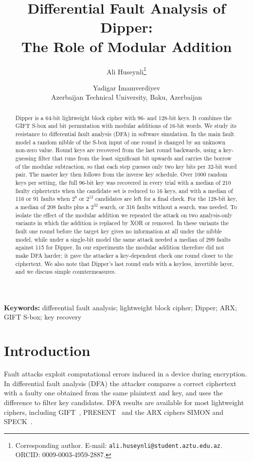 \documentclass[11pt,a4paper]{article}
\title{Differential Fault Analysis of Dipper:\\ The Role of Modular Addition}
\author{
Ali Huseynli\thanks{Corresponding author. E-mail: \texttt{ali.huseynli@student.aztu.edu.az}. ORCID: 0009-0003-4959-2887.}
\and Yadigar Imamverdiyev\\[4pt]
\small Azerbaijan Technical University, Baku, Azerbaijan
}
\date{}
\begin{document}
\maketitle

\begin{abstract}
Dipper is a 64-bit lightweight block cipher with 96- and 128-bit keys. It combines the GIFT
S-box and bit permutation with modular additions of 16-bit words. We study its resistance to
differential fault analysis (DFA) in software simulation. In the main fault model a random
nibble of the S-box input of one round is changed by an unknown non-zero value. Round keys are
recovered from the last round backwards, using a key-guessing filter that runs from the least
significant bit upwards and carries the borrow of the modular subtraction, so that each step
guesses only two key bits per 32-bit word pair. The master key then follows from the inverse
key schedule. Over 1000 random keys per setting, the full 96-bit key was recovered in every
trial with a median of 210 faulty ciphertexts when the candidate set is reduced to 16 keys, and
with a median of 116 or 91 faults when $2^{8}$ or $2^{12}$ candidates are left for a final
check. For the 128-bit key, a median of 208 faults plus a $2^{32}$ search, or 316 faults without
a search, was needed. To isolate the effect of the modular addition we repeated the attack on
two analysis-only variants in which the addition is replaced by XOR or removed. In these
variants the fault one round before the target key gives no information at all under the
nibble model, while under a single-bit model the same attack needed a median of 299 faults
against 115 for Dipper. In our experiments the modular addition therefore did not make DFA
harder; it gave the attacker a key-dependent check one round closer to the ciphertext. We
also note that Dipper's last round ends with a keyless, invertible layer, and we discuss simple
countermeasures.
\end{abstract}

\noindent\textbf{Keywords:} differential fault analysis; lightweight block cipher; Dipper;
ARX; GIFT S-box; key recovery

\section{Introduction}

Fault attacks exploit computational errors induced in a device during encryption. In
differential fault analysis (DFA) the attacker compares a correct ciphertext with a faulty one obtained from the same plaintext
and key, and uses the difference to filter key candidates. DFA results are available for
most lightweight ciphers, including GIFT~\cite{Xie2021,Luo2021,Saha2018}, PRESENT~\cite{Bagheri2013}
and the ARX ciphers SIMON and SPECK~\cite{Tupsamudre2014,Huo2015}.
\end{document}
